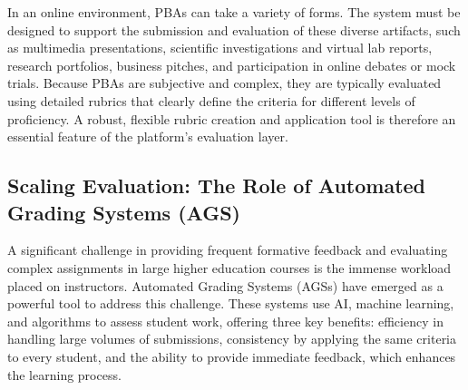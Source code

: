 \documentclass{article}
\begin{document}
In an online environment, PBAs can take a variety of forms. The system must be designed to support the submission and evaluation of these diverse artifacts, such as multimedia presentations, scientific investigations and virtual lab reports, research portfolios, business pitches, and participation in online debates or mock trials.\cite{97, 100} Because PBAs are subjective and complex, they are typically evaluated using detailed rubrics that clearly define the criteria for different levels of proficiency. A robust, flexible rubric creation and application tool is therefore an essential feature of the platform's evaluation layer.\cite{90, 96, 100}

\subsection{Scaling Evaluation: The Role of Automated Grading Systems (AGS)}

A significant challenge in providing frequent formative feedback and evaluating complex assignments in large higher education courses is the immense workload placed on instructors. Automated Grading Systems (AGSs) have emerged as a powerful tool to address this challenge.\cite{102} These systems use AI, machine learning, and algorithms to assess student work, offering three key benefits: efficiency in handling large volumes of submissions, consistency by applying the same criteria to every student, and the ability to provide immediate feedback, which enhances the learning process.\cite{103, 104, 105}
\end{document}
